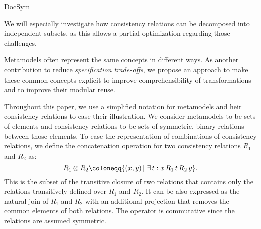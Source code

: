 \begin{copiedFrom}{DocSym}
\begin{description}[leftmargin=\parindent]
        We will especially investigate how consistency relations can be decomposed into independent subsets, as this allows a partial optimization regarding those challenges.
    \item[Make common concepts explicit.] 
        Metamodels often represent the same concepts in different ways. As another contribution to reduce \emph{specification trade-offs}, we propose an approach to make these common concepts explicit to improve comprehensibility of transformations and to improve their modular reuse.
\end{description}


Throughout this paper, we use a simplified notation for metamodels and heir consistency relations to ease their illustration. 
We consider metamodels to be sets of elements and consistency relations to be sets of symmetric, binary relations between those elements.
To ease the representation of combinations of consistency relations, we define the concatenation operation for two consistency relations $R_1$ and $R_2$ as:
\begin{equation*}
    R_1 \concat R_2 \coloneqq \{(x,y)\, |\, \exists t: x\, R_1\, t\, R_2\, y \}.
\end{equation*}
This is the subset of the transitive closure of two relations that contains only the relations transitively defined over $R_1$ and $R_2$.
It can be also expressed as the natural join of $R_1$ and $R_2$ with an additional projection that removes the common elements of both relations.
The operator is commutative since the relations are assumed symmetric.


\end{copiedFrom}
